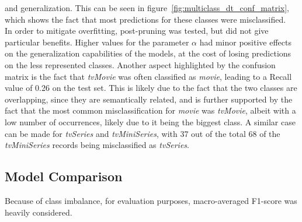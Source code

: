 and generalization. This can be seen in figure~\ref{fig:multiclass_dt_conf_matrix}, which shows the fact
that most predictions for these classes were misclassified.\\
In order to mitigate overfitting, post-pruning was tested, but did not give particular benefits.
Higher values for the parameter $\alpha$ had minor positive effects on the generalization
capabilities of the models, at the cost of losing predictions on the less represented classes.
Another aspect highlighted by the confusion matrix is the fact that \textit{tvMovie} was often
classified as \textit{movie}, leading to a Recall value of 0.26 on the test set.
This is likely due to the fact that the two classes are overlapping, since they are semantically related,
and is further supported by the fact that the most common misclassification for \textit{movie} was
\textit{tvMovie}, albeit with a low number of occurrences, likely due to it being the biggest class.
A similar case can be made for \textit{tvSeries} and \textit{tvMiniSeries}, with 37 out of the total 68
of the \textit{tvMiniSeries} records being misclassified as \textit{tvSeries}.



\subsection{Model Comparison}
Because of class imbalance, for evaluation purposes,
macro-averaged F1-score was heavily considered.